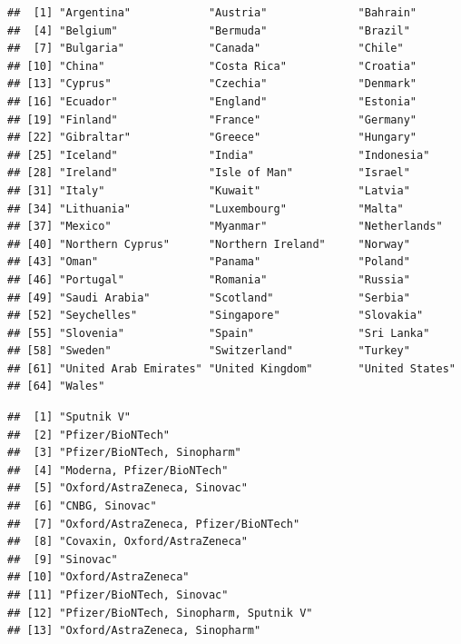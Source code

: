 \documentclass[
]{book}
\newenvironment{Shaded}{\begin{snugshade}}{\end{snugshade}}
\newcommand{\CommentTok}[1]{\textcolor[rgb]{0.56,0.35,0.01}{\textit{#1}}}
\newcommand{\KeywordTok}[1]{\textcolor[rgb]{0.13,0.29,0.53}{\textbf{#1}}}
\newcommand{\NormalTok}[1]{#1}
\newcommand{\OperatorTok}[1]{\textcolor[rgb]{0.81,0.36,0.00}{\textbf{#1}}}
\begin{document}
\begin{verbatim}
##  [1] "Argentina"            "Austria"              "Bahrain"             
##  [4] "Belgium"              "Bermuda"              "Brazil"              
##  [7] "Bulgaria"             "Canada"               "Chile"               
## [10] "China"                "Costa Rica"           "Croatia"             
## [13] "Cyprus"               "Czechia"              "Denmark"             
## [16] "Ecuador"              "England"              "Estonia"             
## [19] "Finland"              "France"               "Germany"             
## [22] "Gibraltar"            "Greece"               "Hungary"             
## [25] "Iceland"              "India"                "Indonesia"           
## [28] "Ireland"              "Isle of Man"          "Israel"              
## [31] "Italy"                "Kuwait"               "Latvia"              
## [34] "Lithuania"            "Luxembourg"           "Malta"               
## [37] "Mexico"               "Myanmar"              "Netherlands"         
## [40] "Northern Cyprus"      "Northern Ireland"     "Norway"              
## [43] "Oman"                 "Panama"               "Poland"              
## [46] "Portugal"             "Romania"              "Russia"              
## [49] "Saudi Arabia"         "Scotland"             "Serbia"              
## [52] "Seychelles"           "Singapore"            "Slovakia"            
## [55] "Slovenia"             "Spain"                "Sri Lanka"           
## [58] "Sweden"               "Switzerland"          "Turkey"              
## [61] "United Arab Emirates" "United Kingdom"       "United States"       
## [64] "Wales"
\end{verbatim}

\begin{Shaded}
\end{Shaded}

\begin{verbatim}
##  [1] "Sputnik V"                            
##  [2] "Pfizer/BioNTech"                      
##  [3] "Pfizer/BioNTech, Sinopharm"           
##  [4] "Moderna, Pfizer/BioNTech"             
##  [5] "Oxford/AstraZeneca, Sinovac"          
##  [6] "CNBG, Sinovac"                        
##  [7] "Oxford/AstraZeneca, Pfizer/BioNTech"  
##  [8] "Covaxin, Oxford/AstraZeneca"          
##  [9] "Sinovac"                              
## [10] "Oxford/AstraZeneca"                   
## [11] "Pfizer/BioNTech, Sinovac"             
## [12] "Pfizer/BioNTech, Sinopharm, Sputnik V"
## [13] "Oxford/AstraZeneca, Sinopharm"
\end{verbatim}
\end{document}
